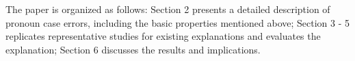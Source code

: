 The paper is organized as follows: Section 2 presents a detailed description of pronoun case errors, including the basic properties mentioned above; Section 3 - 5 replicates representative studies for existing explanations and evaluates the explanation; Section 6 discusses the results and implications.